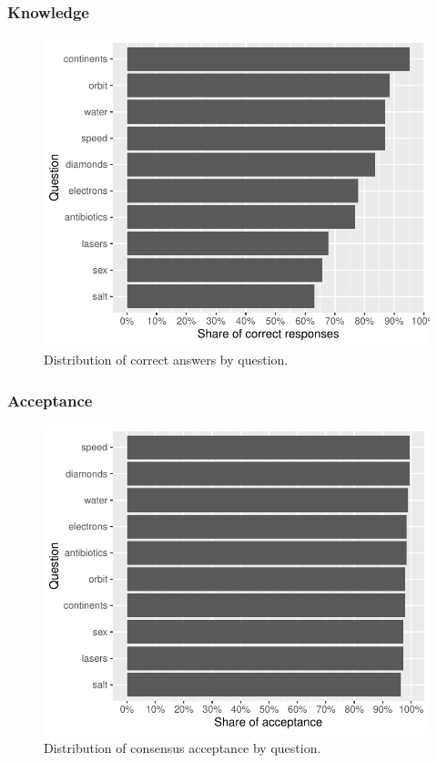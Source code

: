 \documentclass[
  doc,floatsintext]{apa6}
\begin{document}
\subsubsection{Knowledge}\label{knowledge-1}



\begin{figure}
\centering
\includegraphics{output/figures/exp2-questions-knowledge.pdf}
\caption{\label{fig:exp2-questions-knowledge}Distribution of correct answers by question.}
\end{figure}

\subsubsection{Acceptance}\label{acceptance-1}



\begin{figure}
\centering
\includegraphics{output/figures/exp2-questions-acceptance.pdf}
\caption{\label{fig:exp2-questions-acceptance}Distribution of consensus acceptance by question.}
\end{figure}
\end{document}
